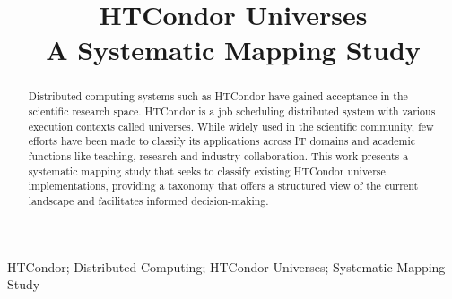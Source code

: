 \documentclass[]{interact}
\theoremstyle{plain}%
\theoremstyle{definition}
\theoremstyle{remark}
\begin{document}

\title{
	HTCondor Universes\\
	A Systematic Mapping Study
}


\author{
}

\maketitle

\begin{abstract}
	Distributed computing systems such as HTCondor have gained acceptance in the scientific research space. HTCondor is a job scheduling distributed system with various execution contexts called universes. While widely used in the scientific community, few efforts have been made to classify its applications across IT domains and academic functions like teaching, research and industry collaboration. This work presents a systematic mapping study that seeks to classify existing HTCondor universe implementations, providing a taxonomy that offers a structured view of the current landscape and facilitates informed decision-making.
\end{abstract}

\begin{keywords}
	HTCondor; Distributed Computing; HTCondor Universes; Systematic Mapping Study
\end{keywords}












\end{document}
